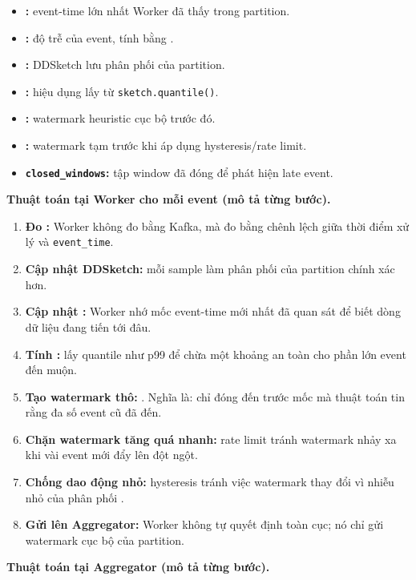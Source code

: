 \documentclass[12pt,a4paper]{article}
\begin{document}
\begin{itemize}
\item \textbf{:} event-time lớn nhất Worker đã thấy trong partition.
\item \textbf{:} độ trễ của event, tính bằng .
\item \textbf{:} DDSketch lưu phân phối  của partition.
\item \textbf{:}  hiệu dụng lấy từ \texttt{sketch.quantile(}\texttt{)}.
\item \textbf{:} watermark heuristic cục bộ trước đó.
\item \textbf{:} watermark tạm trước khi áp dụng hysteresis/rate limit.
\item \textbf{\texttt{closed\_windows}:} tập window đã đóng để phát hiện late event.
\end{itemize}
\textbf{Thuật toán tại Worker cho mỗi event (mô tả từng bước).}

\begin{enumerate}
\item \textbf{Đo :} Worker không đo bằng  Kafka, mà đo bằng chênh lệch giữa thời điểm xử lý và \texttt{event\_time}.
\item \textbf{Cập nhật DDSketch:} mỗi  sample làm phân phối  của partition chính xác hơn.
\item \textbf{Cập nhật :} Worker nhớ mốc event-time mới nhất đã quan sát để biết dòng dữ liệu đang tiến tới đâu.
\item \textbf{Tính :} lấy quantile như p99 để chừa một khoảng an toàn cho phần lớn event đến muộn.
\item \textbf{Tạo watermark thô:} . Nghĩa là: chỉ đóng đến trước mốc mà thuật toán tin rằng đa số event cũ đã đến.
\item \textbf{Chặn watermark tăng quá nhanh:} rate limit tránh watermark nhảy xa khi vài event mới đẩy  lên đột ngột.
\item \textbf{Chống dao động nhỏ:} hysteresis tránh việc watermark thay đổi vì nhiễu nhỏ của phân phối .
\item \textbf{Gửi lên Aggregator:} Worker không tự quyết định toàn cục; nó chỉ gửi watermark cục bộ của partition.
\end{enumerate}
\textbf{Thuật toán tại Aggregator (mô tả từng bước).}
\end{document}
